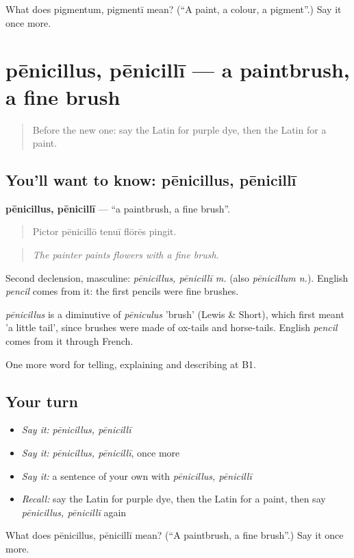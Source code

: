 \begin{tcolorbox}[breakable,colback=teal!4,colframe=teal!35!black,title={Before you move on}]
What does pigmentum, pigmentī mean? (\textquotedblleft{}A paint, a colour, a pigment\textquotedblright{}.) Say it once more.
\end{tcolorbox}
\section[pēnicillus, pēnicillī]{pēnicillus, pēnicillī — a paintbrush, a fine brush}

\label{lesson:LA-C468-penicillus}



\begin{quote}
Before the new one: say the Latin for purple dye, then the Latin for a paint.
\end{quote}

\subsection*{You'll want to know: pēnicillus, pēnicillī}
\textbf{pēnicillus, pēnicillī} — \textquotedblleft{}a paintbrush, a fine brush\textquotedblright{}.

\begin{quote}
Pictor pēnicillō tenuī flōrēs pingit.
\end{quote}

\begin{quote}
\emph{The painter paints flowers with a fine brush.}
\end{quote}

Second declension, masculine: \emph{pēnicillus, pēnicillī m.} (also \emph{pēnicillum n.}). English \emph{pencil} comes from it: the first pencils were fine brushes.

\begin{cousinweb}
\emph{pēnicillus} is a diminutive of \emph{pēniculus} 'brush' (Lewis \& Short), which first meant 'a little tail', since brushes were made of ox-tails and horse-tails. English \emph{pencil} comes from it through French.
\end{cousinweb}

\begin{grammarlens}[title={What you've built}]
One more word for telling, explaining and describing at B1.
\end{grammarlens}

\subsection*{Your turn}
\begin{itemize}
\raggedright
  \item \emph{Say it:} \emph{pēnicillus, pēnicillī}
  \item \emph{Say it:} \emph{pēnicillus, pēnicillī}, once more
  \item \emph{Say it:} a sentence of your own with \emph{pēnicillus, pēnicillī}
  \item \emph{Recall:} say the Latin for purple dye, then the Latin for a paint, then say \emph{pēnicillus, pēnicillī} again
\end{itemize}

\begin{tcolorbox}[breakable,colback=teal!4,colframe=teal!35!black,title={Before you move on}]
What does pēnicillus, pēnicillī mean? (\textquotedblleft{}A paintbrush, a fine brush\textquotedblright{}.) Say it once more.
\end{tcolorbox}
